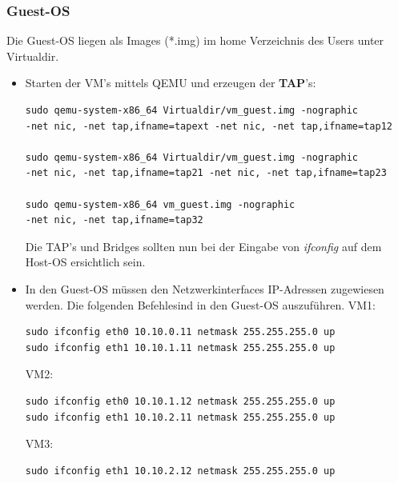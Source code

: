\documentclass[a4,12pt]{scrartcl}
\begin{document}
\subsubsection{Guest-OS}
Die Guest-OS liegen als Images (*.img) im home Verzeichnis des Users unter Virtualdir. 
\begin{itemize}
\item Starten der VM's mittels QEMU und erzeugen der \textbf{TAP}'s:
\begin{lstlisting}
sudo qemu-system-x86_64 Virtualdir/vm_guest.img -nographic 
-net nic, -net tap,ifname=tapext -net nic, -net tap,ifname=tap12

sudo qemu-system-x86_64 Virtualdir/vm_guest.img -nographic
-net nic, -net tap,ifname=tap21 -net nic, -net tap,ifname=tap23

sudo qemu-system-x86_64 vm_guest.img -nographic
-net nic, -net tap,ifname=tap32
\end{lstlisting}
Die TAP's und Bridges sollten nun bei der Eingabe von \textit{ifconfig} auf dem Host-OS ersichtlich sein.

\item In den Guest-OS müssen den Netzwerkinterfaces IP-Adressen zugewiesen werden. Die folgenden Befehlesind in den Guest-OS auszuführen.
\newline
VM1:
\begin{lstlisting}
sudo ifconfig eth0 10.10.0.11 netmask 255.255.255.0 up
sudo ifconfig eth1 10.10.1.11 netmask 255.255.255.0 up
\end{lstlisting}
VM2:
\begin{lstlisting}
sudo ifconfig eth0 10.10.1.12 netmask 255.255.255.0 up
sudo ifconfig eth1 10.10.2.11 netmask 255.255.255.0 up
\end{lstlisting}
VM3:
\begin{lstlisting}
sudo ifconfig eth1 10.10.2.12 netmask 255.255.255.0 up
\end{lstlisting}
\end{itemize}
\end{document}
